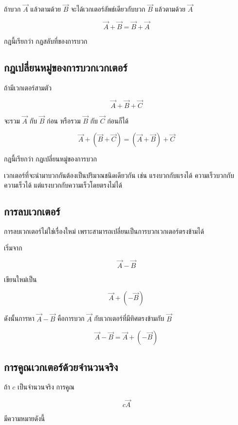 \documentclass[12pt,a4paper]{report}
\begin{document}
ถ้าบวก $\vec{A}$ แล้วตามด้วย $\vec{B}$ จะได้เวกเตอร์ลัพธ์เดียวกับบวก $\vec{B}$ แล้วตามด้วย $\vec{A}$

\[
\vec{A}+\vec{B}=\vec{B}+\vec{A}
\]

กฎนี้เรียกว่า กฎสลับที่ของการบวก

\subsection{กฎเปลี่ยนหมู่ของการบวกเวกเตอร์}

ถ้ามีเวกเตอร์สามตัว

\[
\vec{A}+\vec{B}+\vec{C}
\]

จะรวม $\vec{A}$ กับ $\vec{B}$ ก่อน หรือรวม $\vec{B}$ กับ $\vec{C}$ ก่อนก็ได้

\[
\vec{A}+(\vec{B}+\vec{C})=(\vec{A}+\vec{B})+\vec{C}
\]

กฎนี้เรียกว่า กฎเปลี่ยนหมู่ของการบวก

\begin{tcolorbox}[title=ข้อจำกัดสำคัญ]
เวกเตอร์ที่จะนำมาบวกกันต้องเป็นปริมาณชนิดเดียวกัน เช่น แรงบวกกับแรงได้ ความเร็วบวกกับความเร็วได้ แต่แรงบวกกับความเร็วโดยตรงไม่ได้
\end{tcolorbox}

\subsection{การลบเวกเตอร์}

การลบเวกเตอร์ไม่ใช่เรื่องใหม่ เพราะสามารถเปลี่ยนเป็นการบวกเวกเตอร์ตรงข้ามได้

เริ่มจาก

\[
\vec{A}-\vec{B}
\]

เขียนใหม่เป็น

\[
\vec{A}+(-\vec{B})
\]

ดังนั้นการหา $\vec{A}-\vec{B}$ คือการบวก $\vec{A}$ กับเวกเตอร์ที่มีทิศตรงข้ามกับ $\vec{B}$

\begin{tcolorbox}[title=สูตรการลบเวกเตอร์]
\[
\vec{A}-\vec{B}=\vec{A}+(-\vec{B})
\]
\end{tcolorbox}

\subsection{การคูณเวกเตอร์ด้วยจำนวนจริง}

ถ้า $c$ เป็นจำนวนจริง การคูณ

\[
c\vec{A}
\]

มีความหมายดังนี้
\end{document}
